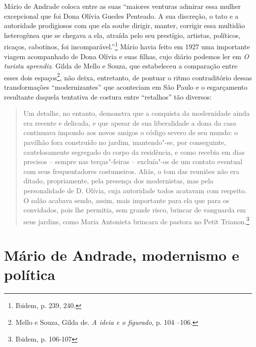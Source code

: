 Mário de Andrade coloca entre as suas ``maiores venturas admirar essa
mulher excepcional que foi Dona Olívia Guedes Penteado. A sua discreção,
o tato e a autoridade prodigiosos com que ela soube dirigir, manter,
corrigir essa multidão heterogênea que se chegava a ela, atraída pelo
seu prestígio, artistas, políticos, ricaços, cabotinos, foi
incomparável.''\footnote{Ibidem, p. 239, 240.} Mário havia feito em 1927
uma importante viagem acompanhado de Dona Olívia e suas filhas, cujo
diário podemos ler em \emph{O turista aprendiz}. Gilda de Mello e Souza,
que estabeleceu a comparação entre esses dois espaços\footnote{Mello e
  Souza, Gilda de. \emph{A ideia e o figurado}, p. 104 --106.}, não
deixa, entretanto, de pontuar o ritmo contraditório dessas
transformações ``modernizantes'' que aconteciam em São Paulo e o
esgarçamento resultante daquela tentativa de costura entre ``retalhos''
tão diversos:

\begin{quote}
Um detalhe, no entanto, demonstra que a conquista da modernidade ainda
era recente e delicada, e que apesar de sua liberalidade a dona da casa
continuava impondo aos novos amigos o código severo de seu mundo: o
pavilhão fora construído no jardim, mantendo"-se, por conseguinte,
cautelosamente segregado do corpo da residência, e como recebia em dias
precisos -- sempre nas terças"-feiras -- excluía"-os de um contato
eventual com seus frequentadores costumeiros. Aliás, o tom das reuniões
não era ditado, propriamente, pela presença dos modernistas, mas pela
personalidade de D. Olívia, cuja autoridade todos acatavam com respeito.
O salão acabava sendo, assim, mais importante para ela que para os
convidados, pois lhe permitia, sem grande risco, brincar de vanguarda em
seus jardins, como Maria Antonieta brincara de pastora no Petit
Trianon.\footnote{Ibidem, p. 106-107}
\end{quote}

\section{Mário de Andrade, modernismo e política}

